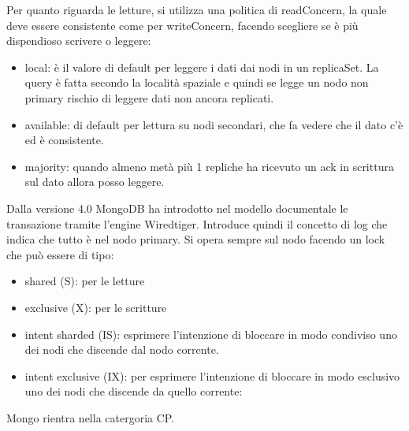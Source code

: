 Per quanto riguarda le letture, si utilizza una politica di readConcern, la quale
deve essere consistente come per writeConcern, facendo scegliere se è più
dispendioso scrivere o leggere:
\begin{itemize}
      \item local: è il valore di default per leggere i dati dai nodi in un
            replicaSet. La query è fatta secondo la località spaziale e quindi
            se legge un nodo non primary rischio di leggere dati non ancora
            replicati.
      \item available: di default per lettura su nodi secondari, che fa vedere
            che il dato c'è ed è consistente.
      \item majority: quando almeno metà più 1 repliche ha ricevuto un ack
            in scrittura sul dato allora posso leggere.
\end{itemize}
Dalla versione 4.0 MongoDB ha introdotto nel modello documentale le transazione
tramite l'engine Wiredtiger. Introduce quindi il concetto di log che indica che
tutto è nel nodo primary. Si opera sempre sul nodo facendo un lock che può essere
di tipo:
\begin{itemize}
      \item shared (S): per le letture
      \item exclusive (X): per le scritture
      \item intent sharded (IS): esprimere l'intenzione di bloccare in
            modo condiviso uno dei nodi che discende dal nodo corrente.
      \item intent exclusive (IX): per esprimere l'intenzione di bloccare in
            modo esclusivo uno dei nodi che discende da quello corrente:
\end{itemize}

Mongo rientra nella catergoria CP.
